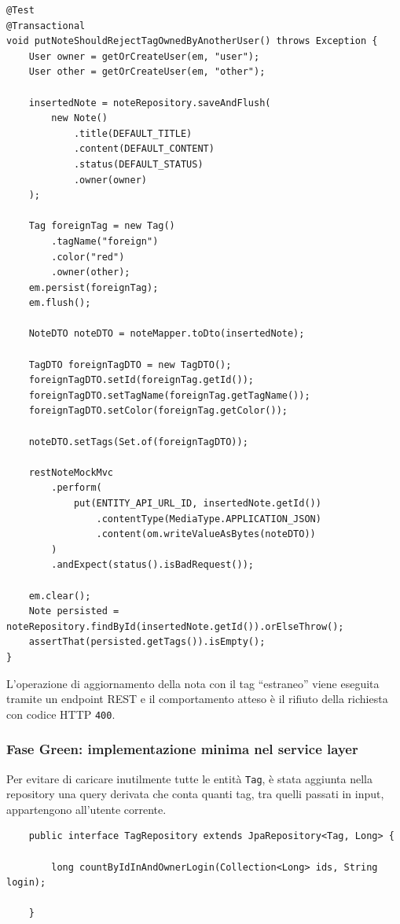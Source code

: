 \captionsetup{type=listing}
\label{lst:tdd-red-note-foreign-tag}
\begin{verbatim}
@Test
@Transactional
void putNoteShouldRejectTagOwnedByAnotherUser() throws Exception {
	User owner = getOrCreateUser(em, "user");
	User other = getOrCreateUser(em, "other");
	
	insertedNote = noteRepository.saveAndFlush(
		new Note()
			.title(DEFAULT_TITLE)
			.content(DEFAULT_CONTENT)
			.status(DEFAULT_STATUS)
			.owner(owner)
	);
	
	Tag foreignTag = new Tag()
		.tagName("foreign")
		.color("red")
		.owner(other);
	em.persist(foreignTag);
	em.flush();
	
	NoteDTO noteDTO = noteMapper.toDto(insertedNote);
	
	TagDTO foreignTagDTO = new TagDTO();
	foreignTagDTO.setId(foreignTag.getId());
	foreignTagDTO.setTagName(foreignTag.getTagName());
	foreignTagDTO.setColor(foreignTag.getColor());
	
	noteDTO.setTags(Set.of(foreignTagDTO));
	
	restNoteMockMvc
		.perform(
			put(ENTITY_API_URL_ID, insertedNote.getId())
				.contentType(MediaType.APPLICATION_JSON)
				.content(om.writeValueAsBytes(noteDTO))
		)
		.andExpect(status().isBadRequest());
	
	em.clear();
	Note persisted = noteRepository.findById(insertedNote.getId()).orElseThrow();
	assertThat(persisted.getTags()).isEmpty();
}
\end{verbatim}

L'operazione di aggiornamento della nota con il tag ``estraneo'' viene eseguita tramite un endpoint REST e il comportamento atteso è il rifiuto della richiesta con codice HTTP \texttt{400}.

\subsubsection{Fase Green: implementazione minima nel service layer}
\label{subsec:green}

Per evitare di caricare inutilmente tutte le entità \texttt{Tag}, è stata aggiunta nella repository una query derivata che conta quanti tag, tra quelli passati in input, appartengono all'utente corrente.

\captionsetup{type=listing}
\label{lst:tdd-green-repository}
\begin{verbatim}
	public interface TagRepository extends JpaRepository<Tag, Long> {
		
		long countByIdInAndOwnerLogin(Collection<Long> ids, String login);
		
	}
\end{verbatim}

